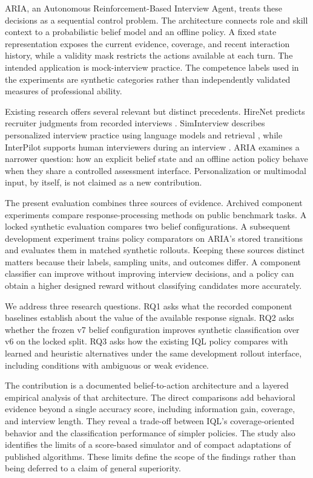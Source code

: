 \documentclass[10pt,a4paper]{article}
\begin{document}
ARIA, an Autonomous Reinforcement-Based Interview Agent, treats these decisions as a sequential control problem. The architecture connects role and skill context to a probabilistic belief model and an offline policy. A fixed state representation exposes the current evidence, coverage, and recent interaction history, while a validity mask restricts the actions available at each turn. The intended application is mock-interview practice. The competence labels used in the experiments are synthetic categories rather than independently validated measures of professional ability.

Existing research offers several relevant but distinct precedents. HireNet predicts recruiter judgments from recorded interviews \cite{hirenet}. SimInterview describes personalized interview practice using language models and retrieval \cite{siminterview}, while InterPilot supports human interviewers during an interview \cite{interpilot}. ARIA examines a narrower question: how an explicit belief state and an offline action policy behave when they share a controlled assessment interface. Personalization or multimodal input, by itself, is not claimed as a new contribution.

The present evaluation combines three sources of evidence. Archived component experiments compare response-processing methods on public benchmark tasks. A locked synthetic evaluation compares two belief configurations. A subsequent development experiment trains policy comparators on ARIA's stored transitions and evaluates them in matched synthetic rollouts. Keeping these sources distinct matters because their labels, sampling units, and outcomes differ. A component classifier can improve without improving interview decisions, and a policy can obtain a higher designed reward without classifying candidates more accurately.

We address three research questions. RQ1 asks what the recorded component baselines establish about the value of the available response signals. RQ2 asks whether the frozen v7 belief configuration improves synthetic classification over v6 on the locked split. RQ3 asks how the existing IQL policy compares with learned and heuristic alternatives under the same development rollout interface, including conditions with ambiguous or weak evidence.

The contribution is a documented belief-to-action architecture and a layered empirical analysis of that architecture. The direct comparisons add behavioral evidence beyond a single accuracy score, including information gain, coverage, and interview length. They reveal a trade-off between IQL's coverage-oriented behavior and the classification performance of simpler policies. The study also identifies the limits of a score-based simulator and of compact adaptations of published algorithms. These limits define the scope of the findings rather than being deferred to a claim of general superiority.
\end{document}
